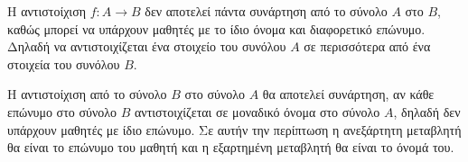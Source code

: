 
\begin{alist}
\item Η αντιστοίχιση $f : A \rightarrow B$ δεν αποτελεί πάντα συνάρτηση από το σύνολο $A$ στο $B$, καθώς μπορεί να υπάρχουν μαθητές με το ίδιο όνομα και διαφορετικό επώνυμο. Δηλαδή να αντιστοιχίζεται ένα στοιχείο του συνόλου $A$ σε περισσότερα από ένα στοιχεία του συνόλου $B$.
\item Η αντιστοίχιση από το σύνολο $B$ στο σύνολο $A$ θα αποτελεί συνάρτηση, αν κάθε επώνυμο στο σύνολο $B$ αντιστοιχίζεται σε μοναδικό όνομα στο σύνολο $A$, δηλαδή δεν υπάρχουν μαθητές με ίδιο επώνυμο. Σε αυτήν την περίπτωση η ανεξάρτητη μεταβλητή θα είναι το επώνυμο του μαθητή και η εξαρτημένη μεταβλητή θα είναι το όνομά του.
\end{alist}

